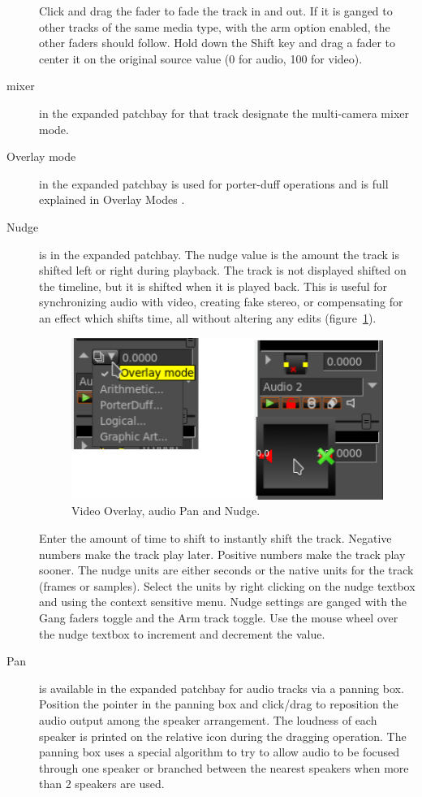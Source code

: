 \begin{description}
    Click and drag the fader to fade the track in and out.  If it is ganged to other tracks of the same media type, with the arm option enabled, the other faders should follow.  Hold down the Shift key and drag a fader to center it on the original source value (0 for audio, 100 for video).
    \item[mixer] in the expanded patchbay for that track designate the multi-camera mixer mode.
    \item[Overlay mode] in the expanded patchbay is used for porter-duff operations and is full explained in Overlay Modes .
    \item[Nudge] is in the expanded patchbay.  The nudge value is the amount the track is shifted left or right during playback. The track is not displayed shifted on the timeline, but it is shifted when it is played back. This is useful for synchronizing audio with video, creating fake stereo, or compensating for an effect which shifts time, all without altering any edits (figure~\ref{fig:overlay}).
    
    \begin{figure}[htpb]
        \centering
        \includegraphics[width=0.7\linewidth]{images/overlay.png}
        \caption{Video Overlay, audio Pan and Nudge.}
        \label{fig:overlay}
    \end{figure}
    
    Enter the amount of time to shift to instantly shift the track. Negative numbers make the track play later. Positive numbers make the track play sooner. The nudge units are either seconds or the native units for the track (frames or samples). Select the units by right clicking on the nudge textbox and using the context sensitive menu. Nudge settings are ganged with the Gang faders toggle and the Arm track toggle. Use the mouse wheel over the nudge textbox to increment and decrement the value.
    \item[Pan] is available in the expanded patchbay for audio tracks via a panning box. Position the pointer in the panning box and click/drag to reposition the audio output among the speaker arrangement. The loudness of each speaker is printed on the relative icon during the dragging operation. The panning box uses a special algorithm to try to allow audio to be focused through one speaker or branched between the nearest speakers when more than 2 speakers are used.  
\end{description}

